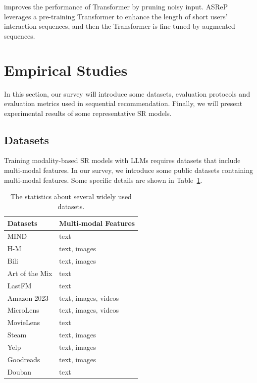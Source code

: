 \documentclass[review]{fcs}
\begin{document}
\cite{END4Rec} improves the performance of Transformer by pruning noisy input.  ASReP \cite{ASReP} leverages a pre-training Transformer to enhance the length of short  users' interaction sequences, and then the Transformer is fine-tuned by augmented sequences.
	\section{Empirical Studies}\label{sec:empirical_studies}
	In this section, our survey will introduce some datasets, evaluation protocols and evaluation metrics used in sequential recommendation. Finally, we will present experimental results of some representative SR models.
	\subsection{Datasets}
	Training modality-based SR models with LLMs requires datasets that include multi-modal features. In our survey, we introduce some public datasets containing multi-modal features. Some specific details are shown in Table~\ref{tab:datasets_mm_f}.

\begin{table}[h]
	\caption{The statistics about several widely used datasets.}
	\label{tab:datasets_mm_f}
	\centering
	\begin{tabular}{ll}
		\hline
		Datasets & Multi-modal Features\\
		\hline
		MIND\tablefootnote{\url{https://msnews.github.io}} & text \\
		H-M\tablefootnote{\url{https://www.kaggle.com/c/h-and-m-personalized-fashion-recommendations/data}} & text, images \\
		Bili\tablefootnote{\url{https://github.com/westlake-repl/NineRec?tab=readme-ov-file}} & text, images \\
		Art of the Mix\tablefootnote{\url{https://brianmcfee.net/data/aotm2011.html}} & text \\
		LastFM\tablefootnote{\url{https://www.kaggle.com/datasets/harshal19t/lastfm-dataset}} & text \\
		Amazon 2023\tablefootnote{\url{https://huggingface.co/datasets/McAuley-Lab/Amazon-Reviews-2023}} & text, images, videos \\
		MicroLens\tablefootnote{\url{https://github.com/westlake-repl/MicroLens}} & text, images, videos \\
		MovieLens\tablefootnote{\url{https://grouplens.org/datasets/movielens/}} & text \\
		Steam\tablefootnote{\url{https://huggingface.co/datasets/FronkonGames/steam-games-dataset}} & text, images \\
		Yelp\tablefootnote{\url{https://www.yelp.com/dataset}} & text, images \\
		Goodreads\tablefootnote{\url{https://www.kaggle.com/datasets/jealousleopard/goodreadsbooks}} & text, images \\
		Douban\tablefootnote{\url{https://www.kaggle.com/datasets/fengzhujoey/douban-datasetratingreviewside-information}} & text \\
		\hline
	\end{tabular}
\end{table}
 
\end{document}
